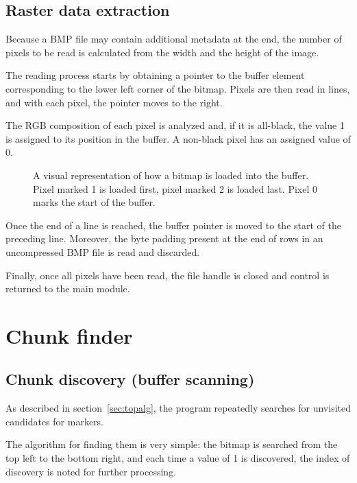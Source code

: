 \documentclass{article}
\begin{document}
	\subsection{Raster data extraction}
	
	Because a BMP file may contain additional metadata at the end, the number
	of pixels to be read is calculated from the width and the height of the
	image.
	
	The reading process starts by obtaining a pointer to the buffer element
	corresponding to the lower left corner of the bitmap. Pixels are then read
	in lines, and with each pixel, the pointer moves to the right.
	
	The RGB composition of each pixel is analyzed and, if it is all-black, the
	value 1 is assigned to its position in the buffer. A non-black pixel has an
	assigned value of 0.
	
	\begin{figure}[h]
		\centering
		\caption{A visual representation of how a bitmap is loaded into the
		buffer. Pixel marked 1 is loaded first, pixel marked 2 is loaded last.
		Pixel 0 marks the start of the buffer.}
	\end{figure}
	
	Once the end of a line is reached, the buffer pointer is moved to the start
	of the preceding line. Moreover, the byte padding present at the end of
	rows in an uncompressed BMP file is read and discarded.
	
	Finally, once all pixels have been read, the file handle is closed and
	control is returned to the main module.
	
	\newpage
	\section{Chunk finder}
	
	\subsection{Chunk discovery (buffer scanning)}
	
	As described in section~\ref{sec:topalg}, the program repeatedly searches
	for unvisited candidates for markers.
	
	The algorithm for finding them is very simple: the bitmap is searched from
	the top left to the bottom right, and each time a value of 1 is discovered,
	the index of discovery is noted for further processing.
	
\end{document}
